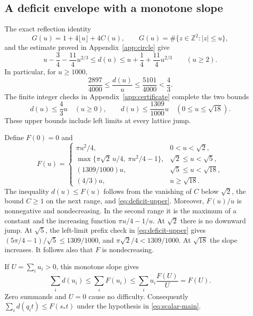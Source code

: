 \documentclass[11pt,reqno]{amsart}
\numberwithin{equation}{section}
\newcommand{\Z}{\mathbb Z}
\newcommand{\abs}[1]{\lvert#1\rvert}
\newcommand{\sstar}{s_*}
\begin{document}
\subsection*{A deficit envelope with a monotone slope}

The exact reflection identity
\begin{equation}\label{eq:reflection}
 G(u)=1+4\lfloor u\rfloor+4C(u),\qquad
 G(u)=\#\{z\in\Z^2:\abs z\le u\},
\end{equation}
and the estimate proved in Appendix~\ref{app:circle} give
\begin{equation}\label{eq:deficit-tail}
 u-\frac34-\frac{11}{4}u^{2/3}\le d(u)
 \le u+\frac14+\frac{11}{4}u^{2/3}\qquad(u\ge2).
\end{equation}
In particular, for $u\ge1000$,
\begin{equation}\label{eq:thousand}
 \frac{2897}{4000}\le\frac{d(u)}u
 \le\frac{5101}{4000}<\frac43.
\end{equation}
The finite integer checks in Appendix~\ref{app:certificate}
complete the two bounds
\begin{equation}\label{eq:deficit-upper}
 d(u)\le\frac43u\quad(u\ge0),\qquad
 d(u)\le\frac{1309}{1000}u\quad(0\le u\le\sqrt{18}).
\end{equation}
These upper bounds include left limits at every lattice jump.

Define $F(0)=0$ and
\begin{equation}\label{eq:envelope}
 F(u)=
 \begin{cases}
 \pi u^2/4,&0<u<\sqrt2,\\
 \max\{\pi\sqrt2\,u/4,\ \pi u^2/4-1\},
        &\sqrt2\le u<\sqrt5,\\
 (1309/1000)u,&\sqrt5\le u<\sqrt{18},\\
 (4/3)u,&u\ge\sqrt{18}.
 \end{cases}
\end{equation}
The inequality $d(u)\le F(u)$ follows from the vanishing of $C$
below $\sqrt2$, the bound $C\ge1$ on the next range, and
\eqref{eq:deficit-upper}. Moreover, $F(u)/u$ is nonnegative
and nondecreasing. In the second range it is the maximum of a
constant and the increasing function $\pi u/4-1/u$.
At $\sqrt2$ there is no downward jump. At $\sqrt5$, the
left-limit prefix check in \eqref{eq:deficit-upper} gives
$(5\pi/4-1)/\sqrt5\le1309/1000$, and
$\pi\sqrt2/4<1309/1000$. At $\sqrt{18}$ the slope increases.
It follows also that $F$ is nondecreasing.

If $U=\sum_i u_i>0$, this monotone slope gives
\begin{equation}\label{eq:aggregate-envelope}
 \sum_i d(u_i)\le\sum_iF(u_i)
 \le\sum_i u_i\frac{F(U)}U=F(U).
\end{equation}
Zero summands and $U=0$ cause no difficulty. Consequently
$\sum_i d(q_it)\le F(\sstar t)$ under the hypothesis in
\eqref{eq:scalar-main}.
\end{document}
